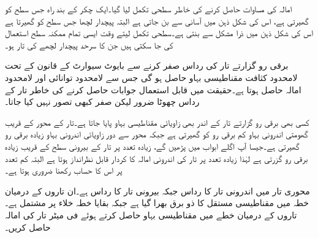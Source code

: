 امالہ کی مساوات حاصل کرنے کی خاطر سطحی تکمل لیا گیا۔ایک چکر کے بند راہ جس سطح کو گھیرتی ہے، اس کی شکل ذہن میں آسانی سے بن جاتی ہے البتہ پیچدار لچھا جس سطح کو گھیرتا ہے اس کی شکل ذہن میں ذرا مشکل سے بنتی ہے۔سطحی تکمل لیتے وقت ایسی تمام ممکنہ سطح استعمال کی جا سکتی ہیں جن کا سرحد پیچدار لچھے کی تار ہو۔

برقی رو گزارتے تار کی رداس صفر کرنے سے بایوٹ سیوارٹ کے قانون کے تحت لامحدود کثافت مقناطیسی بہاو حاصل ہو گی جس سے لامحدود توانائی اور لامحدود امالہ حاصل ہوتا ہے۔حقیقت میں قابل استعمال جوابات حاصل کرنے کی خاطر تار کے رداس  چھوٹا ضرور لیکن صفر کبھی تصور نہیں کیا جاتا۔

کسی بھی برقی رو گزارتے تار کے اندر بھی زاویائی مقناطیسی بہاو پایا جاتا ہے۔تار کے محور کے قریب  گھومتی اندرونی بہاو کم برقی رو کو گھیرتی ہے جبکہ محور سے دور زاویائی اندرونی بہاو زیادہ برقی رو گھیرتی ہے۔جیسا آپ اگلے ابواب میں پڑھیں گے، زیادہ تعدد پر تار کے بیرونی سطح کے قریب زیادہ برقی رو گزرتی ہے لہٰذا زیادہ تعدد پر تار کی اندرونی امالہ کا کردار قابل نظرانداز ہوتا ہے البتہ کم تعدد پر اس کا حساب رکھنا ضروری ہوتا ہے۔

محوری تار میں اندرونی تار کا رداس  جبکہ بیرونی تار کا رداس  ہے۔ان تاروں کے درمیان خطہ  میں  مقناطیسی مستقل کا ذو برق بھرا گیا ہے جبکہ بقایا خطہ خلاء پر مشتمل ہے۔تاروں کے درمیان خطے میں مقناطیسی بہاو حاصل کرتے ہوئے فی میٹر تار کی امالہ حاصل کریں۔


